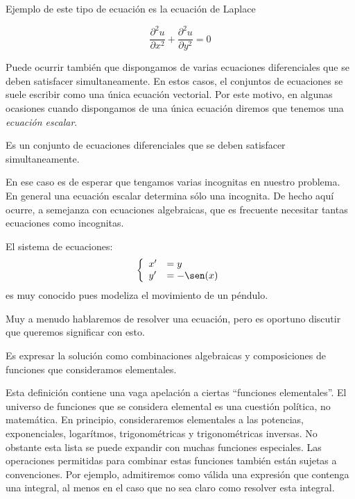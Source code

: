Ejemplo de este tipo de ecuación es la ecuación de Laplace

\[\frac{\partial^2 u}{\partial x^2}+\frac{\partial^2 u}{\partial y^2}=0\]

Puede ocurrir también que dispongamos de varias ecuaciones diferenciales
que se deben satisfacer simultaneamente. 
En estos casos, el conjuntos de ecuaciones se suele escribir como una única 
ecuación vectorial. Por este motivo, en algunas ocasiones cuando dispongamos de una
única ecuación diremos que tenemos una \emph{ecuación  escalar}.

\begin{definicion} Es un  conjunto de ecuaciones diferenciales que se deben satisfacer simultaneamente.
 \end{definicion}

En ese caso es  de esperar que tengamos varias incognitas en
nuestro problema. En general una ecuación escalar determina sólo una incognita. De hecho aquí ocurre, a semejanza con ecuaciones algebraicas, que es frecuente necesitar tantas ecuaciones como incognitas.

\begin{ejemplo} El sistema de ecuaciones:
\[\left\{ \begin{array}{l l} x'&=y \\y'&=-\sen(x) \end{array}\right.\]
es muy conocido pues modeliza el movimiento de un péndulo.
\end{ejemplo}



Muy a menudo hablaremos de resolver una ecuación, pero es oportuno discutir que queremos significar con esto.

\begin{definicion} Es expresar la solución como combinaciones algebraicas y composiciones de funciones que consideramos elementales.
\end{definicion}

Esta definición contiene una vaga apelación a ciertas ``funciones elementales''. El universo de funciones que se considera elemental es una cuestión política, no matemática. En  principio, consideraremos elementales a las potencias, exponenciales, logarítmos, trigonométricas y trigonométricas inversas. No obstante esta lista se puede expandir con muchas funciones especiales.  Las operaciones permitidas para combinar estas funciones
también están sujetas a convenciones. Por ejemplo, admitiremos como válida una expresión que contenga una integral, al menos en el caso que no sea claro como resolver esta integral.

